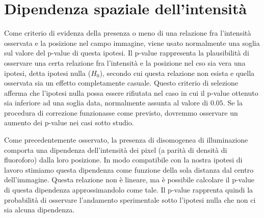 \section{Dipendenza spaziale dell'intensità}


Come criterio di evidenza della presenza o meno di una relazione fra l'intensità osservata e la posizione nel campo immagine, viene usato normalmente una soglia sul valore del p-value di questa ipotesi.
Il p-value rappresenta la plausibilità di osservare una certa relazione fra l'intensità e la posizione nel cso sia vera una ipotesi, detta ipotesi nulla ($H_0$), secondo cui questa relazione non esista e quella osservata sia un effetto completamente casuale.
Questo criterio di selezione afferma che l'ipotesi nulla possa essere rifiutata nel caso in cui il p-value ottenuto sia inferiore ad una soglia data, normalmente assunta al valore di $0.05$.
Se la procedura di correzione funzionasse come previsto, dovremmo osservare un aumento dei p-value nei casi sotto studio.

Come precedentemente osservato, la presenza di disomogenea di illuminazione comporta una dipendenza dell'intensità dei pixel (a parità di densità di fluoroforo) dalla loro posizione.
In modo compatibile con la nostra ipotesi di lavoro stimiamo questa dipendenza come funzione della sola distanza dal centro dell'immagine.
Questa relazione non è lineare, ma è possibile calcolare il p-value di questa dipendenza approssimandolo come tale.
Il p-value rapprenta quindi la probabilità di osservare l'andamento sperimentale sotto l'ipotesi nulla che non ci sia alcuna dipendenza.

